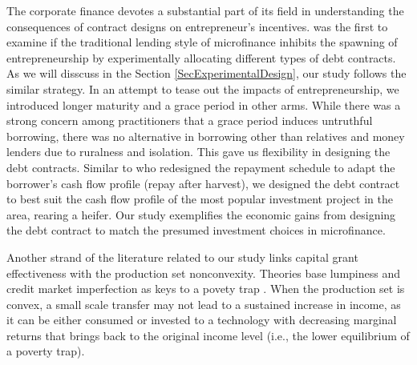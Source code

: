 	The corporate finance devotes a substantial part of its field in understanding the consequences of contract designs on entrepreneur's incentives. \citet{Field2013} was the first to examine if the traditional lending style of microfinance inhibits the spawning of entrepreneurship by experimentally allocating different types of debt contracts.  %
	As we will disscuss in the Section \ref{SecExperimentalDesign}, our study follows the similar strategy. In an attempt to tease out the impacts of entrepreneurship, we introduced longer maturity and a grace period in other arms. While there was a strong concern among practitioners that a grace period induces untruthful borrowing, there was no alternative in borrowing other than relatives and money lenders due to ruralness and isolation. This gave us flexibility in designing the debt contracts. Similar to \citet{Beaman2015} who redesigned the repayment schedule to adapt the borrower's cash flow profile (repay after harvest), we designed the debt contract to best suit the cash flow profile of the most popular investment project in the area, rearing a heifer. %
	Our study exemplifies the economic gains from designing the debt contract to match the presumed investment choices in microfinance.

	Another strand of the literature related to our study links capital grant effectiveness with the production set nonconvexity. Theories base lumpiness and credit market imperfection as keys to a povety trap \citep[e.g., ][]{GalorZeira1993}. When the production set is convex, a small scale transfer may not lead to a sustained increase in income, as it can be either consumed or invested to a technology with decreasing marginal returns that brings back to the original income level (i.e., the lower equilibrium of a poverty trap). 
	

